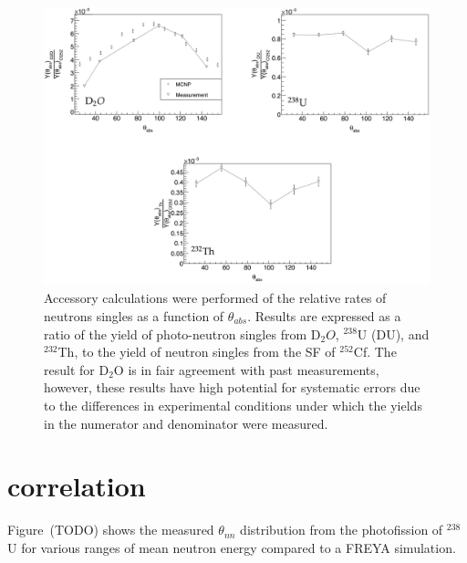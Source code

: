 \begin{figure}
    \includegraphics[width = 1\textwidth]{Content/Results/Singles.png}
    \caption{Accessory calculations were performed of the relative rates of neutrons singles as a function of $\theta_{abs}$. 
    Results are expressed as a ratio of the yield of photo-neutron singles from D$_{2}O$, $^{238}$U (DU), and $^{232}$Th, to the yield of neutron singles from the SF of $^{252}$Cf.
   The result for D$_{2}$O is in fair agreement with past measurements, however, these results have high potential for systematic errors due to the differences in experimental conditions under which the yields in the numerator and denominator were measured.
       }
    \label{fig:Singles}
\end{figure}

\FloatBarrier
\section{correlation}
Figure~(TODO) shows the measured $\theta_{nn}$ distribution from the photofission of $^{238}$U for various ranges of mean neutron energy compared to a FREYA simulation.

